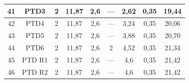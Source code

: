 \documentclass[	DIV=calc,%
							paper=a4,%
							fontsize=12pt,%
							onecolumn]{scrartcl}	 					%
\begin{document}
\begin{tabular}{|c|c|c|c|c|c|c|c|c|}
	41                 & PTD3               & 2                                                    & 11,87                                       & 2,6                                           & ---                                           & 2,62                                             & 0,35                                            & 19,44                                                             \\ \hline
	42                 & PTD4               & 2                                                    & 11,87                                       & 2,6                                           & ---                                           & 3,24                                             & 0,35                                            & 20,06                                                             \\ \hline
	43                 & PTD5               & 2                                                    & 11,87                                       & 2,6                                           & ---                                           & 3,88                                             & 0,35                                            & 20,70                                                             \\ \hline
	44                 & PTD6               & 2                                                    & 11,87                                       & 2,6                                           & 2                                             & 4,52                                             & 0,35                                            & 21,34                                                             \\ \hline
	45                 & PTD R1             & 2                                                    & 11,87                                       & 2,6                                           & ---                                           & 4,6                                              & 0,35                                            & 21,42                                                             \\ \hline
	46                 & PTD R2             & 2                                                    & 11,87                                       & 2,6                                           & ---                                           & 4,6                                              & 0,35                                            & 21,42                                                             \\ \hline

\end{tabular}
\end{document}
